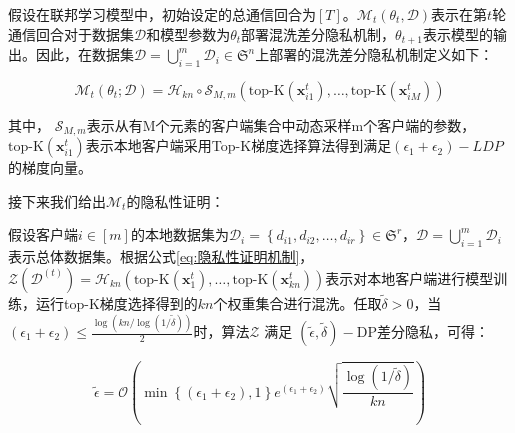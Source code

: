 假设在联邦学习模型中，初始设定的总通信回合为$[T]$。$\mathcal{M}_{t}\left(\theta_{t}, \mathcal{D}\right)$表示在第$t$轮通信回合对于数据集$\mathcal{D}$和模型参数为$\theta_{t}$部署混洗差分隐私机制，$\theta_{t+1}$表示模型的输出。因此，在数据集$\mathcal{D}=\bigcup_{i=1}^{m} \mathcal{D}_{i} \in \mathfrak{S}^{n}$上部署的混洗差分隐私机制定义如下：

\begin{equation}\label{eq:隐私性证明机制}
\mathcal{M}_{t}\left(\theta_{t} ; \mathcal{D}\right)=\mathcal{H}_{k n} \circ \mathcal{S}_{M,m}\left(\text{top-K}\left(\boldsymbol{x}_{i 1}^{t}\right), \ldots, \text{top-K}\left(\boldsymbol{x}_{i M}^{t}\right)\right)
\end{equation}

其中， $\mathcal{S}_{M, m}$表示从有M个元素的客户端集合中动态采样m个客户端的参数，$\text{top-K}\left(\boldsymbol{x}_{i 1}^{t}\right)$表示本地客户端采用Top-K梯度选择算法得到满足$\left(\epsilon_{1}+\epsilon_{2}\right)-LDP$的梯度向量。


接下来我们给出$\mathcal{M}_{t}$的隐私性证明：

假设客户端$i \in[m]$的本地数据集为$\mathcal{D}_{i}=\left\{d_{i 1}, d_{i 2}, \ldots, d_{i r}\right\} \in \mathfrak{S}^{r}$，$\mathcal{D}=\bigcup_{i=1}^{m} \mathcal{D}_{i}$表示总体数据集。根据公式\ref{eq:隐私性证明机制}，$\mathcal{Z}\left(\mathcal{D}^{(t)}\right)=\mathcal{H}_{k n}\left(\text{top-K}\left(\boldsymbol{x}_{1}^{t}\right), \ldots, \text{top-K}\left(\boldsymbol{x}_{k n}^{t}\right)\right)$表示对本地客户端进行模型训练，运行top-K梯度选择得到的$kn$个权重集合进行混洗。任取$\tilde{\delta}>0$，当$\left(\epsilon_{1}+\epsilon_{2}\right) \leq \frac{\log (kn / \log (1 / \tilde{\delta}))}{2}$时，算法$\mathcal{Z}$ 满足 $(\tilde{\epsilon}, \tilde{\delta})-\mathrm{DP}$差分隐私，可得：

\begin{equation}\label{eq:隐私性证明机制2}
\tilde{\epsilon}=\mathcal{O}\left(\min \left\{\left(\epsilon_{1}+\epsilon_{2}\right), 1\right\} e^{\left(\epsilon_{1}+\epsilon_{2}\right)} \sqrt{\frac{\log (1 / \tilde{\delta})}{k n}}\right)
\end{equation}

